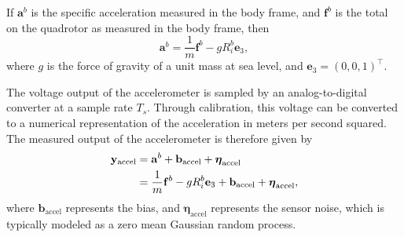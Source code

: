 If $\mathbf{a}^b$ is the specific acceleration measured in the body frame, and $\mathbf{f}^b$ is the total on the quadrotor as measured in the body frame, then 
\begin{equation*}
\mathbf{a}^b = \frac{1}{m}\mathbf{f}^b - g R_i^b \mathbf{e}_3,
\end{equation*}
where $g$ is the force of gravity of a unit mass at sea level, and $\mathbf{e}_3=(0, 0, 1)^\top$.
%

The voltage output of the accelerometer is sampled by an analog-to-digital converter at a sample rate $T_s$. Through calibration, this voltage can be converted to a numerical representation of the acceleration in meters per second squared. The measured output of the accelerometer is therefore given by
\begin{align}
\mathbf{y}_{\text{accel}} &= \mathbf{a}^b + \mathbf{b}_{\text{accel}} + \boldsymbol{\eta}_{\text{accel}} \notag \\
                          &= \frac{1}{m}\mathbf{f}^b - g R_i^b \mathbf{e}_3 + \mathbf{b}_{\text{accel}} + \boldsymbol{\eta}_{\text{accel}},
                          \label{eq:accelerometer_measurement}
\end{align}
where $\mathbf{b}_{\text{accel}}$ represents the bias, and $\boldsymbol{\eta}_{\text{accel}}$ represents the sensor noise, which is typically modeled as a zero mean Gaussian random process.

